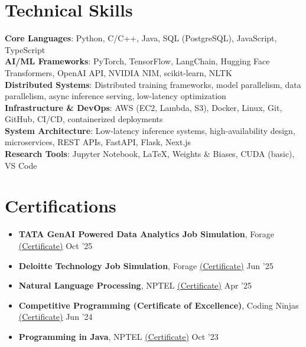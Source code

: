 \documentclass[letterpaper,11pt]{article}
\begin{document}
\section{Technical Skills}
 \begin{itemize}[leftmargin=0.15in, label={}]
    \small{\item{
     \textbf{Core Languages}{: Python, C/C++, Java, SQL (PostgreSQL), JavaScript, TypeScript} \\
     \textbf{AI/ML Frameworks}{: PyTorch, TensorFlow, LangChain, Hugging Face Transformers, OpenAI API, NVIDIA NIM, scikit-learn, NLTK} \\
     \textbf{Distributed Systems}{: Distributed training frameworks, model parallelism, data parallelism, async inference serving, low-latency optimization} \\
     \textbf{Infrastructure \& DevOps}{: AWS (EC2, Lambda, S3), Docker, Linux, Git, GitHub, CI/CD, containerized deployments} \\
     \textbf{System Architecture}{: Low-latency inference systems, high-availability design, microservices, REST APIs, FastAPI, Flask, Next.js} \\
     \textbf{Research Tools}{: Jupyter Notebook, LaTeX, Weights \& Biases, CUDA (basic), VS Code}
    }}
 \end{itemize}

\section{Certifications}
\begin{itemize}[leftmargin=0.15in, label={}]
  \small\item{\textbf{TATA GenAI Powered Data Analytics Job Simulation}, Forage \href{https://www.theforage.com/completion-certificates/ifobHAoMjQs9s6bKS/gMTdCXwDdLYoXZ3wG_ifobHAoMjQs9s6bKS_TEDMb6o8madCwetbK_1759673341869_completion_certificate.pdf}{\underline{(Certificate)}} \hfill Oct '25}
  \small\item{\textbf{Deloitte Technology Job Simulation}, Forage \href{https://forage-uploads-prod.s3.amazonaws.com/completion-certificates/9PBTqmSxAf6zZTseP/udmxiyHeqYQLkTPvf_9PBTqmSxAf6zZTseP_TEDMb6o8madCwetbK_1751085370079_completion_certificate.pdf}{\underline{(Certificate)}} \hfill Jun '25}
  \small\item{\textbf{Natural Language Processing}, NPTEL \href{https://drive.google.com/file/d/1cWh8hPr6ttQioToQBsCkGL2_qT6fHM3Q/view?usp=sharing}{\underline{(Certificate)}} \hfill Apr '25}
  \small\item{\textbf{Competitive Programming (Certificate of Excellence)}, Coding Ninjas \href{https://certificate.codingninjas.com/view/3264b16618500623}{\underline{(Certificate)}} \hfill Jun '24}
  \small\item{\textbf{Programming in Java}, NPTEL \href{https://archive.nptel.ac.in/content/noc/NOC23/SEM2/Ecertificates/106/noc23-cs74/Course/NPTEL23CS74S83880108220365656.pdf}{\underline{(Certificate)}} \hfill Oct '23}
\end{itemize}
\end{document}
